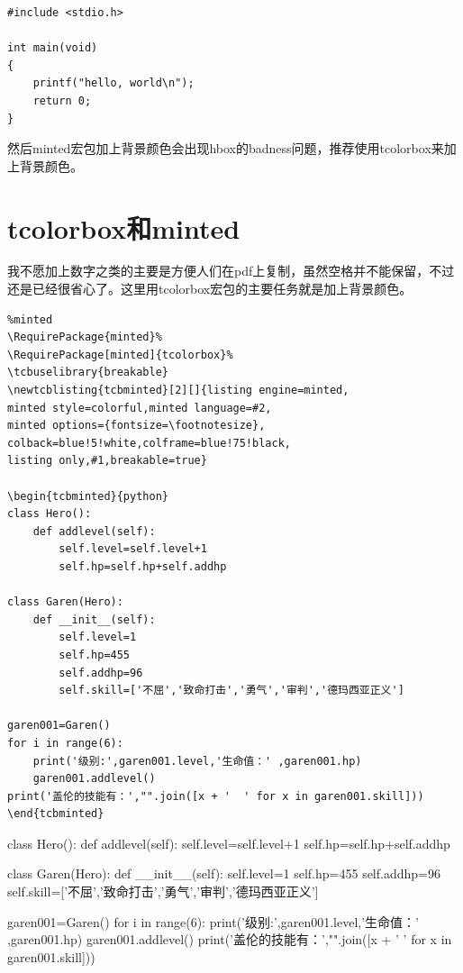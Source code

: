\documentclass[11pt,oneside]{book}
\begin{document}
\begin{verbatim}
#include <stdio.h>

int main(void)
{
    printf("hello, world\n");
    return 0;
}
\end{verbatim}

然后minted宏包加上背景颜色会出现hbox的badness问题，推荐使用tcolorbox来加上背景颜色。


\section{tcolorbox和minted}
我不愿加上数字之类的主要是方便人们在pdf上复制，虽然空格并不能保留，不过还是已经很省心了。这里用tcolorbox宏包的主要任务就是加上背景颜色。

\begin{Verbatim}
%minted
\RequirePackage{minted}%
\RequirePackage[minted]{tcolorbox}%
\tcbuselibrary{breakable}
\newtcblisting{tcbminted}[2][]{listing engine=minted,
minted style=colorful,minted language=#2,
minted options={fontsize=\footnotesize},
colback=blue!5!white,colframe=blue!75!black,
listing only,#1,breakable=true}

\begin{tcbminted}{python}
class Hero():
    def addlevel(self):
        self.level=self.level+1
        self.hp=self.hp+self.addhp

class Garen(Hero):
    def __init__(self):
        self.level=1
        self.hp=455
        self.addhp=96
        self.skill=['不屈','致命打击','勇气','审判','德玛西亚正义']

garen001=Garen()
for i in range(6):
    print('级别:',garen001.level,'生命值：' ,garen001.hp)
    garen001.addlevel()
print('盖伦的技能有：',"".join([x + '  ' for x in garen001.skill]))
\end{tcbminted}
\end{Verbatim}

\begin{tcbpython}[]
class Hero():
    def addlevel(self):
        self.level=self.level+1
        self.hp=self.hp+self.addhp

class Garen(Hero):
    def __init__(self):
        self.level=1
        self.hp=455
        self.addhp=96
        self.skill=['不屈','致命打击','勇气','审判','德玛西亚正义']

garen001=Garen()
for i in range(6):
    print('级别:',garen001.level,'生命值：' ,garen001.hp)
    garen001.addlevel()
print('盖伦的技能有：',"".join([x + '  ' for x in garen001.skill]))
\end{tcbpython}
\end{document}
